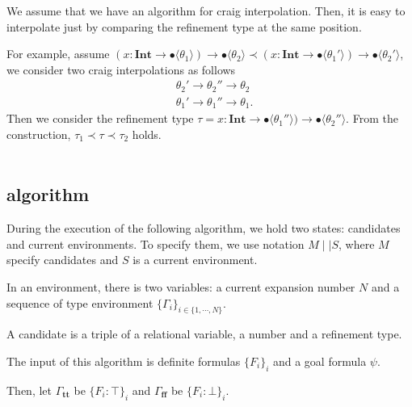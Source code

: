\documentclass[runningheads]{llncs}
\newcommand \true {\textbf{tt}}
\newcommand \false {\textbf{ff}}
\newcommand \stypeint {\textbf{Int}}
\newcommand \stypebool {\bullet}
\newcommand \typeint[1]{{#1} : \stypeint}
\newcommand \typebool[1]{\stypebool \langle #1 \rangle}
\begin{document}
We assume that we have an algorithm for craig interpolation.
Then, it is easy to interpolate just by comparing the refinement type at the
same position.

For example, assume \(
(\typeint{x} \to \typebool{\theta_1}) \to \typebool{\theta_2}
\prec
(\typeint{x} \to \typebool{\theta_1'}) \to \typebool{\theta_2'}
\), we consider two craig interpolations as follows
\begin{align*}
    &\theta_2' \rightarrow \theta_2'' \rightarrow \theta_2\\
    &\theta_1' \rightarrow \theta_1'' \rightarrow \theta_1.
\end{align*}
Then we consider the refinement type
\( \tau = \typeint{x} \to \typebool{\theta_1''}) \to \typebool{\theta_2''} \).
From the construction, \( \tau_1 \prec \tau \prec \tau_2 \) holds.

\begin{align*}
\end{align*}


\subsection{algorithm}

During the execution of the following algorithm,
we hold two states: candidates and current environments.
To specify them, we use notation \( M \mid \mid S \), where
\( M \) specify candidates and \( S \) is a current environment.

In an environment, there is two variables:
a current expansion number \( N \)
and a sequence of type environment \( \{\Gamma_i\}_{i \in \{1, \cdots, N\}} \).

A candidate is a triple of a relational variable, a number and a refinement type.

The input of this algorithm is definite formulas \(\{F_i\}_i\) and a goal formula
\(\psi\).

Then, let \( \Gamma_\true \) be \( \{F_i: \top\}_i \)
and \( \Gamma_\false \) be \( \{F_i: \bot \}_i \).
\end{document}
